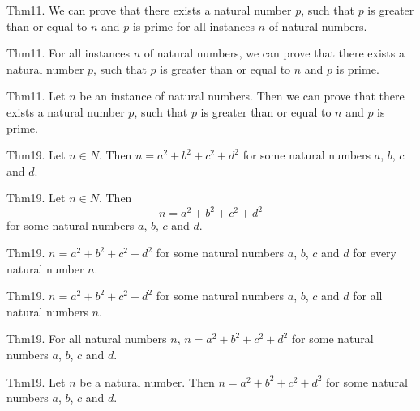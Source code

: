 \documentclass{article}
\begin{document}
Thm11. We can prove that there exists a natural number $p$, such that $p$ is greater than or equal to $n$ and $p$ is prime for all instances $n$ of natural numbers.

Thm11. For all instances $n$ of natural numbers, we can prove that there exists a natural number $p$, such that $p$ is greater than or equal to $n$ and $p$ is prime.

Thm11. Let $n$ be an instance of natural numbers. Then we can prove that there exists a natural number $p$, such that $p$ is greater than or equal to $n$ and $p$ is prime.

Thm19. Let $n \in N$. Then $n = a ^{ 2}+ b ^{ 2}+ c ^{ 2}+ d ^{ 2}$ for some natural numbers $a$, $b$, $c$ and $d$.

Thm19. Let $n \in N$. Then $$n = a ^{ 2}+ b ^{ 2}+ c ^{ 2}+ d ^{ 2}$$ for some natural numbers $a$, $b$, $c$ and $d$.

Thm19. $n = a ^{ 2}+ b ^{ 2}+ c ^{ 2}+ d ^{ 2}$ for some natural numbers $a$, $b$, $c$ and $d$ for every natural number $n$.

Thm19. $n = a ^{ 2}+ b ^{ 2}+ c ^{ 2}+ d ^{ 2}$ for some natural numbers $a$, $b$, $c$ and $d$ for all natural numbers $n$.

Thm19. For all natural numbers $n$, $n = a ^{ 2}+ b ^{ 2}+ c ^{ 2}+ d ^{ 2}$ for some natural numbers $a$, $b$, $c$ and $d$.

Thm19. Let $n$ be a natural number. Then $n = a ^{ 2}+ b ^{ 2}+ c ^{ 2}+ d ^{ 2}$ for some natural numbers $a$, $b$, $c$ and $d$.
\end{document}
